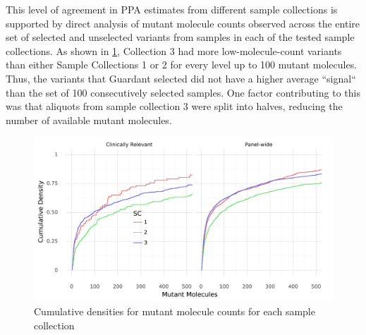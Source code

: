 \documentclass[12pt]{protocol}
\begin{document}
\begin{appendices}
This level of agreement in PPA estimates from different sample collections is supported by direct
analysis of mutant molecule counts observed across the entire set of selected and unselected
variants from samples in each of the tested sample collections.  As shown in
\cref{fig:cdf_molecule_counts}, Collection 3 had more low-molecule-count variants than either
Sample Collections 1 or 2 for every level up to 100 mutant molecules.  Thus, the variants that
Guardant selected did not have a higher average ``signal`` than the set of 100 consecutively
selected samples. One factor contributing to this was that aliquots from sample collection 3 were
split into halves, reducing the number of available mutant molecules.

\begin{figure}[H]
    \centering
    \includegraphics{figures/mol_plot.png}
    \caption{Cumulative densities for mutant molecule counts for each sample collection}
    \label{fig:cdf_molecule_counts}
\end{figure}

\end{appendices}
\end{document}
